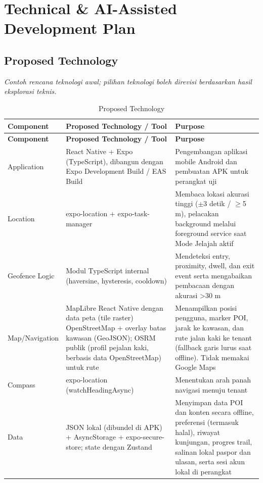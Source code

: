 \chapter{Technical \& AI-Assisted Development Plan}
\label{bab:technical-ai-assisted-development-plan}
\section{Proposed Technology}

\textit{Contoh rencana teknologi awal; pilihan teknologi boleh direvisi berdasarkan hasil eksplorasi teknis.}

\begin{longtable}{|L{0.333}|L{0.333}|L{0.333}|}
\caption{Proposed Technology}\\
\hline
{}\textbf{Component} & \textbf{Proposed Technology / Tool} & \textbf{Purpose} \\ \hline
\endfirsthead
\hline
{}\textbf{Component} & \textbf{Proposed Technology / Tool} & \textbf{Purpose} \\ \hline
\endhead
Application & React Native + Expo (TypeScript), dibangun dengan Expo Development Build / EAS Build & Pengembangan aplikasi mobile Android dan pembuatan APK untuk perangkat uji \\ \hline
Location & expo-location + expo-task-manager & Membaca lokasi akurasi tinggi (\(\pm\)3 detik / \(\ge\)5 m), pelacakan background melalui foreground service saat Mode Jelajah aktif \\ \hline
Geofence Logic & Modul TypeScript internal (haversine, hysteresis, cooldown) & Mendeteksi entry, proximity, dwell, dan exit event serta mengabaikan pembacaan dengan akurasi \textgreater{}30 m \\ \hline
Map/Navigation & MapLibre React Native dengan data peta (tile raster) OpenStreetMap + overlay batas kawasan (GeoJSON); OSRM publik (profil pejalan kaki, berbasis data OpenStreetMap) untuk rute & Menampilkan posisi pengguna, marker POI, jarak ke kawasan, dan rute jalan kaki ke tenant (fallback garis lurus saat offline). Tidak memakai Google Maps \\ \hline
Compass & expo-location (watchHeadingAsync) & Menentukan arah panah navigasi menuju tenant \\ \hline
Data & JSON lokal (dibundel di APK) + AsyncStorage + expo-secure-store; state dengan Zustand & Menyimpan data POI dan konten secara offline, preferensi (termasuk halal), riwayat kunjungan, progres trail, salinan lokal paspor dan ulasan, serta sesi akun lokal di perangkat \\ \hline

\end{longtable}
